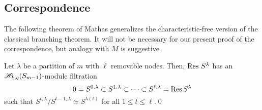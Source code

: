 \documentclass{amsart}
\begin{document}
\subsection{Correspondence}
The following theorem of Mathas generalizes the characteristic-free version of the classical branching theorem.\cite{Mathas-article}
It will not be necessary for our present proof of the correspondence, but analogy with $M$ is suggestive.
\begin{theorem}
  Let $\lambda$ be a partition of $m$ with $\ell$ removable nodes.
  Then, $\operatorname{Res} \, S^\lambda$ has an $\mathscr{H}_{k,q}(S_{m-1})$-module filtration
  \[
    0 = S^{0,\lambda} \subset S^{1,\lambda} \subset \cdots \subset S^{\ell,\lambda} = \operatorname{Res} S^\lambda
  \]
  such that $S^{t,\lambda} / S^{t-1,\lambda} \simeq S^{\lambda(t)}$ for all $1 \leq t \leq \ell$.\qed
\end{theorem}
\end{document}
